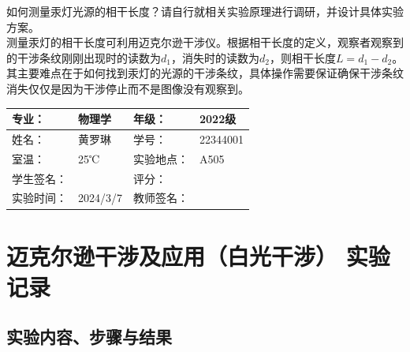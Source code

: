 \documentclass[dvipsnames, svgnames,a4paper,11pt]{article}
\begin{document}
	\begin{question}
		如何测量汞灯光源的相干长度？请自行就相关实验原理进行调研，并设计具体实验方案。 \\
		测量汞灯的相干长度可利用迈克尔逊干涉仪。根据相干长度的定义，观察者观察到的干涉条纹刚刚出现时的读数为$d_{1}$，消失时的读数为$d_{2}$，则相干长度$L=d_{1}-d_{2}$。其主要难点在于如何找到汞灯的光源的干涉条纹，具体操作需要保证确保干涉条纹消失仅仅是因为干涉停止而不是图像没有观察到。
	\end{question}
	
	
	
	
	\clearpage
	
	\begin{table}
		\renewcommand\arraystretch{1.7}
		\centering
		\begin{tabularx}{\textwidth}{|X|X|X|X|}
			\hline
			专业： & 物理学 & 年级： & 2022级 \\
			\hline
			姓名： & 黄罗琳 & 学号： & 22344001\\
			\hline
			室温： &  25℃& 实验地点： & A505 \\
			\hline
			学生签名：&  & 评分： &\\
			\hline
			实验时间：& 2024/3/7 & 教师签名：&\\
			\hline
		\end{tabularx}
	\end{table}
	
	\section{迈克尔逊干涉及应用（白光干涉） \quad\heiti 实验记录}
	
	\subsection{实验内容、步骤与结果}
	
\end{document}
